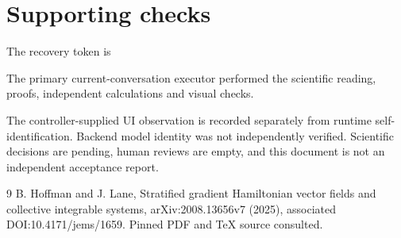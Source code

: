 \documentclass[10pt]{article}
\begin{document}
\section*{Supporting checks}
The recovery token is\par
The primary current-conversation executor performed the scientific reading, proofs, independent calculations and visual checks.\par
The controller-supplied UI observation is recorded separately from runtime self-identification. Backend model identity was not independently verified. Scientific decisions are pending, human reviews are empty, and this document is not an independent acceptance report.\par
9 B. Hoffman and J. Lane, Stratified gradient Hamiltonian vector fields and collective integrable systems, arXiv:2008.13656v7 (2025), associated DOI:10.4171/jems/1659. Pinned PDF and TeX source consulted.\par
\end{document}
